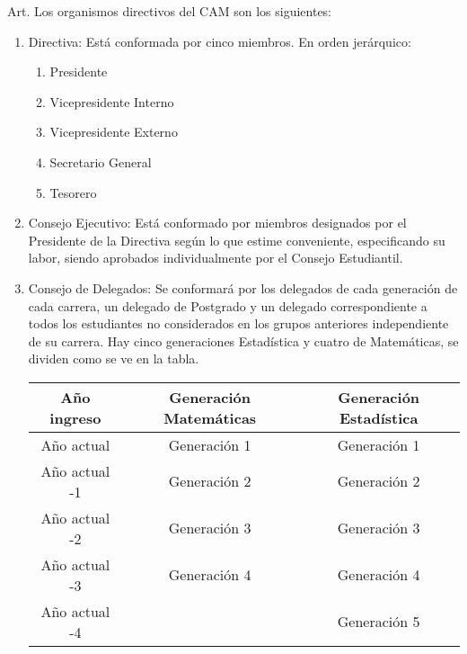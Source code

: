 \documentclass[letterpaper,11pt]{article}
\newcounter{art}
\newenvironment{art}{
    Art.\refstepcounter{art} \theart\:
}{}
\begin{document}
\begin{art}\label{definicionesOrganismos}
    Los organismos directivos del CAM son los siguientes:
    \begin{enumerate}
        \item Directiva: Está conformada por cinco miembros. En orden jerárquico:
              \begin{enumerate}
                  \item Presidente
                  \item Vicepresidente Interno
                  \item Vicepresidente Externo
                  \item Secretario General
                  \item Tesorero
              \end{enumerate}
        \item Consejo Ejecutivo: Está conformado por miembros designados por el Presidente de la Directiva según lo que estime conveniente, especificando su labor, siendo aprobados individualmente por el Consejo Estudiantil.
        \item Consejo de Delegados: Se conformará por los delegados de cada generación de cada carrera, un delegado de Postgrado y un delegado correspondiente a todos los estudiantes no considerados en los grupos anteriores independiente de su carrera. Hay cinco generaciones Estadística y cuatro de Matemáticas, se dividen como se ve en la tabla.
              \begin{center}
                  \begin{tabular}{|c|c|c|}
                      \hline
                      Año ingreso   & Generación Matemáticas & Generación Estadística \\
                      \hline
                      Año actual    & Generación 1           & Generación 1           \\
                      Año actual -1 & Generación 2           & Generación 2           \\
                      Año actual -2 & Generación 3           & Generación 3           \\
                      Año actual -3 & Generación 4           & Generación 4           \\
                      Año actual -4 &                        & Generación 5           \\
                      \hline
                  \end{tabular}

\end{center}
\end{enumerate}
\end{art}
\end{document}
